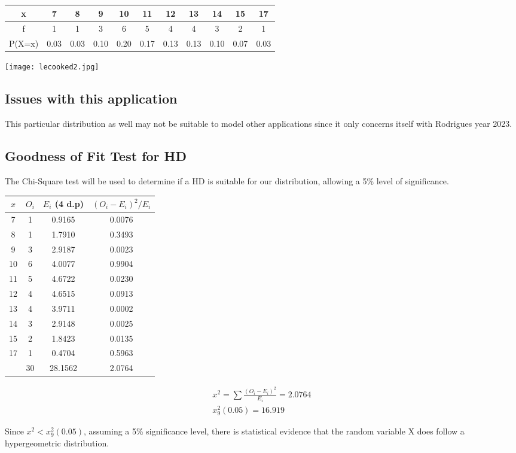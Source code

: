 \documentclass{article}
\begin{document}
\begin{center}
  \begin{tabular}{|c|c|c|c|c|c|c|c|c|c|c|}
    \hline
    x & 7 & 8 & 9 & 10 & 11 & 12 & 13 & 14 & 15 & 17 \\
    \hline
    f & 1 & 1 & 3 & 6 & 5 & 4 & 4 & 3 & 2 & 1 \\
    \hline
    P(X=x) & 0.03 & 0.03 & 0.10 & 0.20 & 0.17 & 0.13 & 0.13 & 0.10 & 0.07 & 0.03 \\
    \hline
  \end{tabular}
\end{center}

\begin{center}
  \texttt{[image: lecooked2.jpg]}
\end{center}

\subsection{Issues with this application}
This particular distribution as well may not be suitable to model
other applications since it only concerns itself with Rodrigues 
year 2023.

\subsection{Goodness of Fit Test for HD}
The Chi-Square test will be used to determine if a HD is suitable for
our distribution, allowing a 5\% level of significance.

\begin{center}
  \begin{tabular}{|c|c|c|c|}
  \hline
    $ x $ & $ O_i $ & $ E_i $ (4 d.p) & $(O_i - E_i)^2 / E_i$ \\
    \hline
    \hline
    7  & 1 & 0.9165 & 0.0076 \\
    8  & 1 & 1.7910 & 0.3493 \\
    9  & 3 & 2.9187 & 0.0023 \\
    10 & 6 & 4.0077 & 0.9904 \\
    11 & 5 & 4.6722 & 0.0230 \\
    12 & 4 & 4.6515 & 0.0913 \\
    13 & 4 & 3.9711 & 0.0002 \\
    14 & 3 & 2.9148 & 0.0025 \\
    15 & 2 & 1.8423 & 0.0135 \\
    17 & 1 & 0.4704 & 0.5963 \\
    \hline
    \hline
       & 30& 28.1562& 2.0764 \\
    \hline
  \end{tabular}
\end{center}

\begin{gather*}
  x^2 = \sum \frac{(O_i - E_i)^2}{E_i} = 2.0764 \\[5pt]
  x^2_9(0.05) = 16.919
\end{gather*}

Since $ x^2 < x^2_9(0.05) $,
assuming a 5\% significance level,
there is statistical evidence that
the random variable X does 
follow a hypergeometric distribution.
\end{document}
